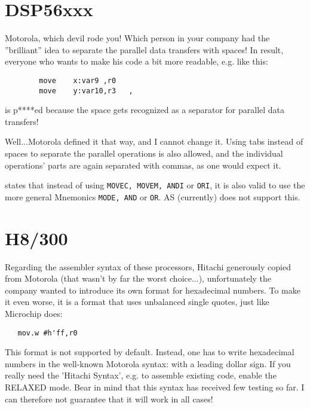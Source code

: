 \documentclass[12pt,twoside]{report}
\newcommand{\tty}[1]{{\tt #1}}
\newcommand{\asname}{{AS}}
\begin{document}

\section{DSP56xxx}

Motorola, which devil rode you!  Which person in your company had the
''brilliant'' idea to separate the parallel data transfers with spaces!
In result, everyone who wants to make his code a bit more readable,
e.g. like this:
\begin{verbatim}
        move    x:var9 ,r0
        move    y:var10,r3   ,
\end{verbatim}
is p****ed because the space gets recognized as a separator for
parallel data transfers!

Well...Motorola defined it that way, and I cannot change it.  Using
tabs instead of spaces to separate the parallel operations is also
allowed, and the individual operations' parts are again separated
with commas, as one would expect it.

\cite{Mot56} states that instead of using \tty{MOVEC, MOVEM, ANDI} or
\tty{ORI}, it is also valid to use the more general Mnemonics \tty{MODE,
AND} or \tty{OR}.
\asname{} (currently) does not support this.


\section{H8/300}

Regarding the assembler syntax of these processors, Hitachi generously
copied from Motorola (that wasn't by far the worst choice...),
unfortunately the company wanted to introduce its own format for
hexadecimal numbers.  To make it even worse, it is a format that uses
unbalanced single quotes, just like Microchip does:
\begin{verbatim}
   mov.w #h'ff,r0
\end{verbatim}
This format is not supported by default.  Instead, one has to write
hexadecimal numbers in the well-known Motorola syntax: with a leading
dollar sign.  If you really need the 'Hitachi Syntax', e.g. to assemble
existing code, enable the RELAXED mode.  Bear in mind that this syntax has
received few testing so far.  I can therefore not guarantee that it will
work in all cases!

\end{document}
